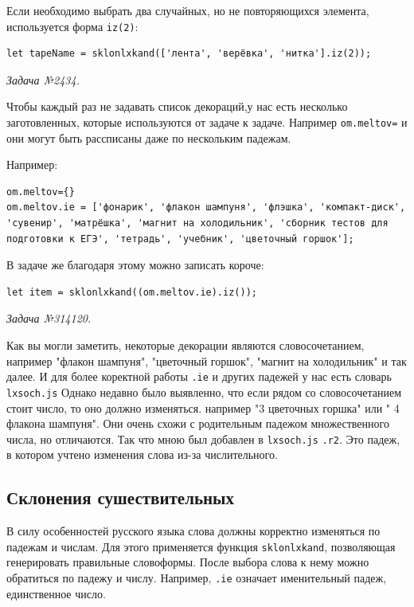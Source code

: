 Если необходимо выбрать два случайных, но не повторяющихся элемента, используется форма \texttt{iz(2)}:  
\begin{lstlisting}
let tapeName = sklonlxkand(['лента', 'верёвка', 'нитка'].iz(2));
\end{lstlisting}
\textsl{Задача №2434.}
 

Чтобы каждый раз не задавать список декораций,у нас есть несколько заготовленных, которые используются от задаче к задаче. Например \texttt{om.meltov={}} и они могут быть рассписаны даже по нескольким падежам.

Например: 
\begin{lstlisting}
om.meltov={}
om.meltov.ie = ['фонарик', 'флакон шампуня', 'флэшка', 'компакт-диск', 'сувенир', 'матрёшка', 'магнит на холодильник', 'сборник тестов для подготовки к ЕГЭ', 'тетрадь', 'учебник', 'цветочный горшок'];
\end{lstlisting}
В задаче же благодаря этому можно записать короче:
\begin{lstlisting}
let item = sklonlxkand((om.meltov.ie).iz());
\end{lstlisting}
\textsl{Задача №314120.}

Как вы могли заметить, некоторые декорации являются словосочетанием, например "флакон шампуня", "цветочный горшок", "магнит на холодильник" и так далее. И для более коректной работы \texttt{.ie} и других падежей у нас есть словарь \texttt{lxsoch.js}
Однако недавно было выявленно, что если рядом со словосочетанием стоит число, то оно должно изменяться. например "3 цветочных горшка" или " 4 флакона шампуня". Они очень схожи с родительным падежом множественного числа, но отличаются. Так что мною был добавлен в  
\texttt{lxsoch.js} \texttt{.r2}. Это падеж, в котором учтено изменения слова из-за числительного. 


\subsection{Склонения сушествительных}

В силу особенностей русского языка слова должны корректно изменяться по падежам и числам. Для этого применяется функция \texttt{sklonlxkand}, позволяющая генерировать правильные словоформы.  
После выбора слова к нему можно обратиться по падежу и числу. Например, \texttt{.ie} означает именительный падеж, единственное число.  

